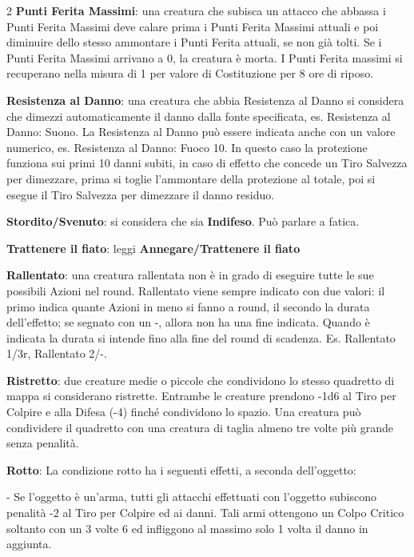 \begin{multicols}{2}
\textbf{Punti Ferita Massimi}: una creatura che subisca un attacco che abbassa i Punti Ferita Massimi deve calare prima i Punti Ferita Massimi attuali e poi diminuire dello stesso ammontare i Punti Ferita attuali, se non già tolti. Se i Punti Ferita Massimi arrivano a 0, la creatura è morta. I Punti Ferita massimi si recuperano nella misura di 1 per valore di Costituzione per 8 ore di riposo.

\textbf{Resistenza al Danno}: una creatura che abbia Resistenza al Danno si considera che dimezzi automaticamente il danno dalla fonte specificata, es. Resistenza al Danno: Suono. La Resistenza al Danno può essere indicata anche con un valore numerico, es. Resistenza al Danno: Fuoco 10. In questo caso la protezione funziona sui primi 10 danni subiti, in caso di effetto che concede un Tiro Salvezza per dimezzare, prima si toglie l'ammontare della protezione al totale, poi si esegue il Tiro Salvezza per dimezzare il danno residuo.

\textbf{Stordito/Svenuto}: si considera che sia \textbf{Indifeso}. Può parlare a fatica.

\textbf{Trattenere il fiato}: leggi \textbf{Annegare/Trattenere il fiato}

\textbf{Rallentato}: una creatura rallentata non è in grado di eseguire tutte le sue possibili Azioni nel round. Rallentato viene sempre indicato con due valori: il primo indica quante Azioni in meno si fanno a round, il secondo la durata dell'effetto; se segnato con un -, allora non ha una fine indicata. Quando è indicata la durata si intende fino alla fine del round di scadenza. Es. Rallentato 1/3r, Rallentato 2/-.

\textbf{Ristretto}\hypertarget{ristretto}{}: due creature medie o piccole che condividono lo stesso quadretto di mappa si considerano ristrette. Entrambe le creature prendono -1d6 al Tiro per Colpire e alla Difesa (-4) finché condividono lo spazio. Una creatura può condividere il quadretto con una creatura di taglia almeno tre volte più grande senza penalità.

\textbf{Rotto}: La condizione rotto ha i seguenti effetti, a seconda dell'oggetto:

- Se l'oggetto è un'arma, tutti gli attacchi effettuati con l'oggetto subiscono penalità -2 al Tiro per Colpire ed ai danni. Tali armi ottengono un Colpo Critico soltanto con un 3 volte 6 ed infliggono al massimo solo 1 volta il danno in aggiunta.


\end{multicols}
